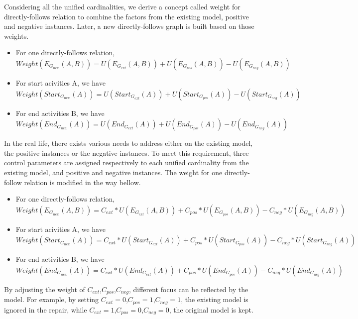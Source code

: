 Considering all the unified cardinalities, we derive a concept called weight for directly-follows relation to combine the factors from the existing model, positive and negative instances. Later, a new directly-follows graph is built based on those weights. 
\begin{definition}
	\begin{itemize}
		\item For one directly-follows relation, \[ Weight(E_{G_{new}}(A,B)) =  U(E_{G_{ext}}(A,B))+ U(E_{G_{pos}}(A,B))  - U(E_{G_{neg}}(A,B))\]
		\item For start acivities A, we have 
		\[ Weight(Start_{G_{new}}(A)) =  U(Start_{G_{ext}}(A)) + U(Start_{G_{pos}}(A)) - U(Start_{G_{neg}}(A)) \]
		\item For end activities B, we have
		\[ Weight(End_{G_{new}}(A)) = U(End_{G_{ext}}(A)) +  U(End_{G_{pos}}(A)) - U(End_{G_{neg}}(A)) \]
	\end{itemize}
\end{definition} 
In the real life, there exists various needs to address either on the existing model, the positive instances or the negative instances. To meet this requirement, three control parameters are assigned respectively to each unified cardinality from the existing model, and positive and negative instances. The weight for one directly-follow relation is modified in the way bellow. 
\begin{definition}
	\begin{itemize}
		\item For one directly-follows relation, \[ Weight(E_{G_{new}}(A,B)) = C_{ext}*U(E_{G_{ext}}(A,B))+ C_{pos}*U(E_{G_{pos}}(A,B))  - C_{neg}*U(E_{G_{neg}}(A,B))\]
		\item For start acivities A, we have 
		\[ Weight(Start_{G_{new}}(A)) = C_{ext}*U(Start_{G_{ext}}(A))+ C_{pos}*U(Start_{G_{pos}}(A)) - C_{neg}*U(Start_{G_{neg}}(A)) \]
		\item For end activities B, we have
		\[ Weight(End_{G_{new}}(A)) =  C_{ext}*U(End_{G_{ext}}(A)) + C_{pos}*U(End_{G_{pos}}(A))  - C_{neg}*U(End_{G_{neg}}(A)) \]
	\end{itemize}
\end{definition}
By adjusting the weight of $C_{ext}$,$C_{pos}$,$C_{neg}$, different focus can be reflected by the model. For example, by setting $C_{ext}=0$,$C_{pos}=1$,$C_{neg}=1$, the existing model is ignored in the repair, while  $C_{ext}=1$,$C_{pos}=0$,$C_{neg}=0$, the original model is kept.
